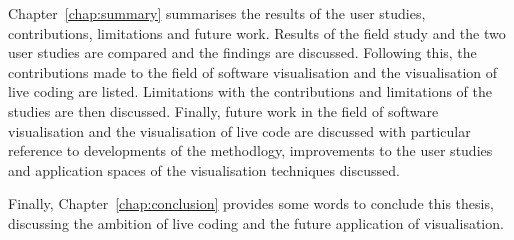 Chapter~\ref{chap:summary} summarises the results of the user studies, contributions, limitations and future work. Results of the field study and the two user studies are compared and the findings are discussed. Following this, the contributions made to the field of software visualisation and the visualisation of live coding are listed. Limitations with the contributions and limitations of the studies are then discussed. Finally, future work in the field of software visualisation and the visualisation of live code are discussed with particular reference to developments of the methodlogy, improvements to the user studies and application spaces of the visualisation techniques discussed.

Finally, Chapter~\ref{chap:conclusion} provides some words to conclude this thesis, discussing the ambition of live coding and the future application of visualisation.


